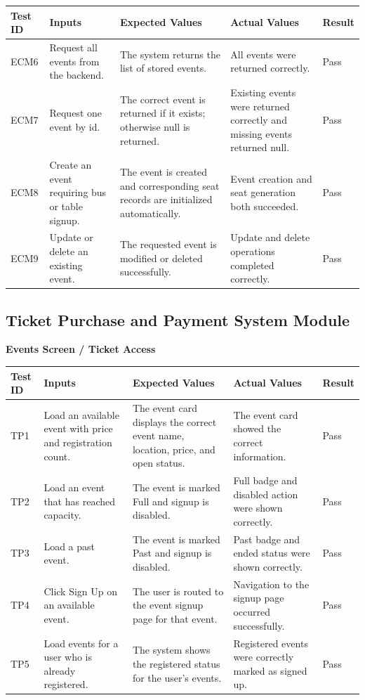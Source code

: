 \documentclass[12pt, titlepage]{article}
\begin{document}
{\small
\setlength{\tabcolsep}{4pt}
\begin{tabularx}{\textwidth}{L{1.6cm}Y Y Y L{1.4cm}}
\toprule
\textbf{Test ID} & \textbf{Inputs} & \textbf{Expected Values} & \textbf{Actual Values} & \textbf{Result} \\
\midrule
ECM6 & Request all events from the backend. & The system returns the list of stored events. & All events were returned correctly. & Pass \\
ECM7 & Request one event by id. & The correct event is returned if it exists; otherwise null is returned. & Existing events were returned correctly and missing events returned null. & Pass \\
ECM8 & Create an event requiring bus or table signup. & The event is created and corresponding seat records are initialized automatically. & Event creation and seat generation both succeeded. & Pass \\
ECM9 & Update or delete an existing event. & The requested event is modified or deleted successfully. & Update and delete operations completed correctly. & Pass \\
\bottomrule
\end{tabularx}
}

\subsection{Ticket Purchase and Payment System Module}

\textbf{Events Screen / Ticket Access}

{\small
\setlength{\tabcolsep}{4pt}
\begin{tabularx}{\textwidth}{L{1.6cm}Y Y Y L{1.4cm}}
\toprule
\textbf{Test ID} & \textbf{Inputs} & \textbf{Expected Values} & \textbf{Actual Values} & \textbf{Result} \\
\midrule
TP1 & Load an available event with price and registration count. & The event card displays the correct event name, location, price, and open status. & The event card showed the correct information. & Pass \\
TP2 & Load an event that has reached capacity. & The event is marked Full and signup is disabled. & Full badge and disabled action were shown correctly. & Pass \\
TP3 & Load a past event. & The event is marked Past and signup is disabled. & Past badge and ended status were shown correctly. & Pass \\
TP4 & Click Sign Up on an available event. & The user is routed to the event signup page for that event. & Navigation to the signup page occurred successfully. & Pass \\
TP5 & Load events for a user who is already registered. & The system shows the registered status for the user's events. & Registered events were correctly marked as signed up. & Pass \\
\bottomrule
\end{tabularx}
}
\end{document}
